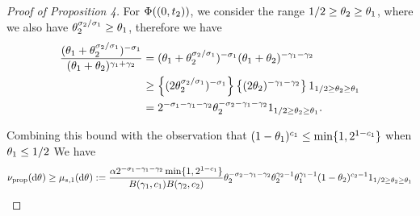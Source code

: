 \begin{proof}[Proof of Proposition 4]
For $\Phi((0, t_2))$, we consider the range $1/2 \ge \theta_{2}\ge \theta_{1}$, where we also have $\theta_{2}^{\sigma_{2}/\sigma_{1}}\ge \theta_{1}$, therefore we have 
\begin{align*}
    \frac{(\variantfreqperpop{1}+\variantfreqperpop{2}^{\rate{2}/\rate{1}})^{-\rate{1}}}{(\variantfreqperpop{1}+\variantfreqperpop{2})^{\corr{1}+\corr{2}}}&=(\variantfreqperpop{1}+\variantfreqperpop{2}^{\rate{2}/\rate{1}})^{-\rate{1}}(\variantfreqperpop{1}+\variantfreqperpop{2})^{-\corr{1}-\corr{2}}\\
    &\ge \left\{ (2\variantfreqperpop{2}^{\rate{2}/\rate{1}} )^{-\rate{1}} \right\} \left\{(2\variantfreqperpop{2})^{-\corr{1} - \corr{2}} \right\}\bm{1}_{1/2 \ge \variantfreqperpop{2}\ge \variantfreqperpop{1} } \\
    &= 2^{-\rate{1}-\corr{1}-\corr{2}} \variantfreqperpop{2}^{-\rate{2}-\corr{1}-\corr{2}}\bm{1}_{1/2 \ge \variantfreqperpop{2}\ge \variantfreqperpop{1} }.
\end{align*}

Combining this bound with the observation that $(1-\theta_{1})^{c_{1}}\le \min\{1, 2^{1-c_{1}}\}$ when $\theta_{1}\le 1/2$ We have
\begin{align*}
    \ratemeasproposed(\de\vecvariantfreq{})\ge\mu_{s,1}(\de\vecvariantfreq{}):= \frac{\mass 2^{-\rate{1}-\corr{1}-\corr{2}}\min\{1, 2^{1-\conc{1}}\}}{B(\corr{1}, \conc{1})B(\corr{2}, \conc{2})}\variantfreqperpop{2}^{-\rate{2}-\corr{1}-\corr{2}} \variantfreqperpop{2}^{\corr{2}-1}\variantfreqperpop{1}^{\corr{1}-1}(1-\variantfreqperpop{2})^{\conc{2}-1} \bm{1}_{1/2 \ge \variantfreqperpop{2}\ge \variantfreqperpop{1}}
\end{align*}


\end{proof}
